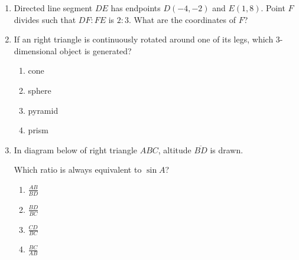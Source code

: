 \documentclass[12pt, oneside]{article}
\begin{document}
\begin{enumerate}[itemsep=1.1cm]
\item Directed line segment $DE$ has endpoints $D(-4, -2)$ and $E(1,8)$. Point $F$ divides such that $DF:FE$ is $2:3$. What are the coordinates of $F$?

\item If an right triangle is continuously rotated around one of its legs, which 3-dimensional object is generated?
    \begin{enumerate}
      \item cone
      \item sphere
      \item pyramid
      \item prism
    \end{enumerate}

\item In diagram below of right triangle $ABC$, altitude $\overline{BD}$ is drawn.
  \begin{center}
  \end{center}
    Which ratio is always equivalent to $\sin A$?
    \begin{multicols}{2}
    \begin{enumerate}
        \item $\displaystyle \frac{AB}{BD}$
        \item $\displaystyle \frac{BD}{BC}$ 
        \item $\displaystyle \frac{CD}{BC}$
        \item $\displaystyle \frac{BC}{AB}$
    \end{enumerate}
    \end{multicols}

\end{enumerate}
\end{document}
